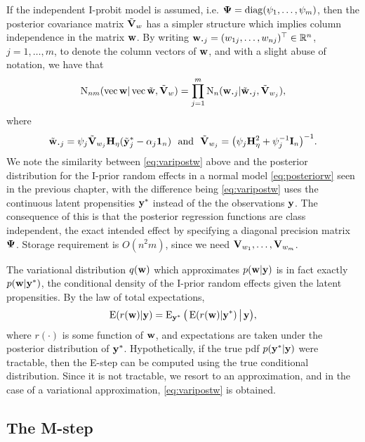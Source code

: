 If the independent I-probit model is assumed, i.e. ${\bm\Psi} = \operatorname{diag}(\psi_1,\dots,\psi_m)$, then the posterior covariance matrix $\tilde{{\mathbf V}}_w$ has a simpler structure which implies column independence in the matrix ${\mathbf w}$.
By writing $\bw_{\bigcdot j} = (w_{1j},\dots,w_{nj})^\top \in \bbR^n$, $j=1,\dots,m$, to denote the column vectors of ${\mathbf w}$, and with a slight abuse of notation, we have that
\begin{align*}
  \N_{nm}(\vecc \bw|\vecc\wtilde, \tilde\bV_w) 
  = \prod_{j=1}^m \N_{n}(\bw_{\bigcdot j}|\tilde\bw_{\bigcdot j}, \tilde\bV_{w_j}),
\end{align*}
where 
\[
  \tilde \bw_{\bigcdot j} = \psi_j\tilde \bV_{w_j}\bH_\eta (\tilde\by^*_j - \alpha_j\bone_n) \ \text{ and } \ \tilde \bV_{w_j} = \big(\psi_j\bH_{\eta}^2 + \psi_j^{-1}\bI_n \big)^{-1}.
\]
We note the similarity between \cref{eq:varipostw} above and the posterior distribution for the I-prior random effects in a normal model \cref{eq:posteriorw} seen in the previous chapter, with the difference being \cref{eq:varipostw} uses the continuous latent propensities ${\mathbf y}^*$ instead of the the observations ${\mathbf y}$.
The consequence of this is that the posterior regression functions are class independent, the exact intended effect by specifying a diagonal precision matrix ${\bm\Psi}$.
Storage requirement is $O(n^2m)$, since we need ${\mathbf V}_{w_1},\dots,{\mathbf V}_{w_m}$.

\begin{remark}
  The variational distribution $q({\mathbf w})$ which approximates $p({\mathbf w}|{\mathbf y})$ is in fact exactly $p({\mathbf w}|{\mathbf y}^*)$, the conditional density of the I-prior random effects given the latent propensities.
  By the law of total expectations, 
  \begin{gather*}
    \operatorname{E}(r({\mathbf w})|{\mathbf y}) = \operatorname{E}_{{\mathbf y}^*}\big( \operatorname{E}(r({\mathbf w})|{\mathbf y}^*) \,\big|\, {\mathbf y} \big),
  \end{gather*}
  where $r(\cdot)$ is some function of ${\mathbf w}$, and expectations are taken under the posterior distribution of ${\mathbf y}^*$.
  Hypothetically, if the true pdf $p({\mathbf y}^*|{\mathbf y})$ were tractable,  then the E-step can be computed using the true conditional distribution.
  Since it is not tractable, we resort to an approximation, and in the case of a variational approximation, \cref{eq:varipostw} is obtained.
\end{remark}



\subsection{The M-step}
\label{sec:varupdeta}

